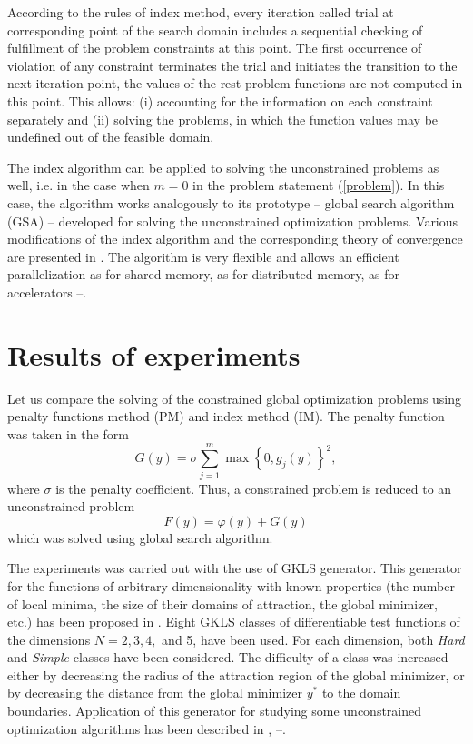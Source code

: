 \documentclass{llncs}
\begin{document}
According to the rules of index method, every iteration called trial at corresponding point of the search domain includes a sequential checking of fulfillment of the problem constraints at this point. The first occurrence of violation of any constraint terminates the trial and initiates the transition to the next iteration point, the values of the rest problem functions are not computed in this point. This allows: (i) accounting for the information on each constraint separately and (ii) solving the problems, in which the function values may be undefined out of the feasible domain.

The index algorithm can be applied to solving the unconstrained problems as well, i.e. in the case when $m = 0$ in the problem statement (\ref{problem}). In this case, the algorithm works analogously to its prototype -- global search algorithm (GSA) -- developed for solving the unconstrained optimization problems. Various modifications of the index algorithm and the corresponding theory of convergence are presented in \cite{Strongin2000}. The algorithm is very flexible and allows an efficient parallelization as for shared memory, as for distributed memory, as for accelerators \cite{Barkalov2010}--\cite{Lebedev2016}.

\section{Results of experiments}

Let us compare the solving of the constrained global optimization problems using penalty functions method (PM) and index method (IM). The penalty function was taken in the form 
\[
G(y) = \sigma \sum_{j=1}^m\max\left\{0,g_j(y)\right\}^2,
\]
where $\sigma$ is the penalty coefficient. Thus, a constrained problem is reduced to an unconstrained problem
\[
F(y)=\varphi(y)+G(y)
\]
which was solved using global search algorithm.

The experiments was carried out with the use of GKLS generator.  This generator for the functions of arbitrary dimensionality with known properties (the number of local minima, the size of their domains of attraction, the global minimizer, etc.) has been proposed in \cite{Gaviano}. Eight GKLS classes of differentiable test functions of the dimensions $N = 2, 3, 4,$ and 5, have been used. For each dimension, both \textit{Hard} and \textit{Simple} classes have been considered. The difficulty of a class was increased either by decreasing the radius of the attraction region of the global minimizer, or by decreasing the distance from the global minimizer $y^\ast$ to the domain boundaries. Application of this generator for studying some unconstrained optimization algorithms has been described in \cite{Grishagin2016}, \cite{Kvasov2006}--\cite{SergeyevKvasov2015}. 
\end{document}
